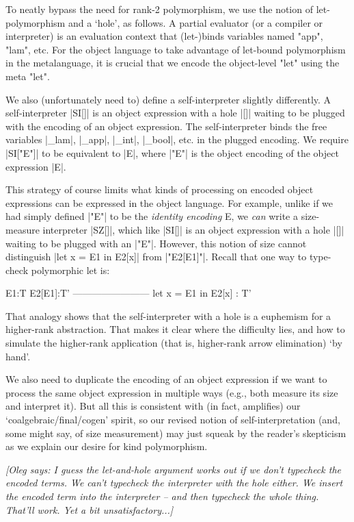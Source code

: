 \documentclass[preprint]{sigplanconf}
\newcommand{\oleg}[1]{{\it [Oleg says: #1]}}
\begin{document}
To neatly bypass the need for rank-2 polymorphism, we use the notion
of let-polymorphism and a `hole', as follows.  A partial evaluator (or
a compiler or interpreter) is an evaluation context that (let-)binds
variables named "app", "lam", etc.  For the object language to
take advantage of let-bound polymorphism in the metalanguage, it
is crucial that we encode the object-level "let" using the meta "let".  

We also (unfortunately need to) define a self-interpreter slightly
differently.  A self-interpreter |SI[]| is an object expression with a
hole |[]| waiting to be plugged with the encoding of an object expression.
The self-interpreter binds the free variables |_lam|, |_app|, |_int|, |_bool|,
etc. in the plugged encoding.  We require |SI["E"]| to be equivalent to |E|,
where |"E"| is the object encoding of the object expression |E|.

This strategy of course limits what kinds of processing on encoded
object expressions can be expressed in the object language.  For
example, unlike if we had simply defined |"E"| to be the \emph{identity
encoding} E, we \emph{can} write a size-measure interpreter |SZ[]|, 
which like |SI[]| is
an object expression with a hole |[]| waiting to be plugged with 
an |"E"|.
However, this notion of size cannot distinguish |let x = E1 in E2[x]|
from |"E2[E1]"|.  Recall that one way to type-check polymorphic let is:
\begin{code}
        E1:T    E2[E1]:T'
    ------------------------
    let x = E1 in E2[x] : T'
\end{code}
That analogy shows that the self-interpreter with a hole is a
euphemism for a higher-rank abstraction. That makes it clear where
the difficulty lies, and how to simulate the higher-rank application
(that is, higher-rank arrow elimination) `by hand'.

We also need to duplicate the encoding of an object expression if we
want to process the same object expression in multiple ways (e.g., both
measure its size and interpret it).  But all this is consistent with (in
fact, amplifies) our `coalgebraic/final/cogen' spirit, so our revised
notion of self-interpretation (and, some might say, of size measurement)
may just squeak by the reader's skepticism as we explain our desire for
kind polymorphism.

\oleg{I guess the let-and-hole argument works out if we don't typecheck the
encoded terms. We can't typecheck the interpreter with the hole
either. We insert the encoded term into the interpreter -- and then
typecheck the whole thing. That'll work. Yet a bit unsatisfactory...}
\end{document}
